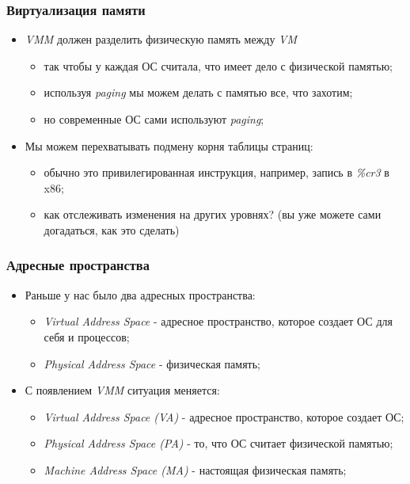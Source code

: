 \begin{frame}
\frametitle{Виртуализация памяти}
\begin{itemize}
  \item<1-> \emph{VMM} должен разделить физическую память между \emph{VM}
    \begin{itemize}
      \item так чтобы у каждая ОС считала, что имеет дело с физической памятью;
      \item используя \emph{paging} мы можем делать с памятью все, что захотим;
      \item но современные ОС сами используют \emph{paging};
    \end{itemize}
  \item<2-> Мы можем перехватывать подмену корня таблицы страниц:
    \begin{itemize}
      \item обычно это привилегированная инструкция, например, запись в
            \emph{\%cr3} в x86;
      \item как отслеживать изменения на других уровнях? (вы уже можете сами
            догадаться, как это сделать)
    \end{itemize}
\end{itemize}
\end{frame}

\begin{frame}
\frametitle{Адресные пространства}
\begin{itemize}
  \item<1-> Раньше у нас было два адресных пространства:
    \begin{itemize}
      \item \emph{Virtual Address Space} - адресное пространство, которое
            создает ОС для себя и процессов;
      \item \emph{Physical Address Space} - физическая память;
    \end{itemize}
  \item<2-> С появлением \emph{VMM} ситуация меняется:
    \begin{itemize}
      \item \emph{Virtual Address Space (VA)} - адресное пространство, которое
            создает ОС;
      \item \emph{Physical Address Space (PA)} - то, что ОС считает физической
            памятью;
      \item \emph{Machine Address Space (MA)} - настоящая физическая память;
    \end{itemize}
\end{itemize}
\end{frame}


